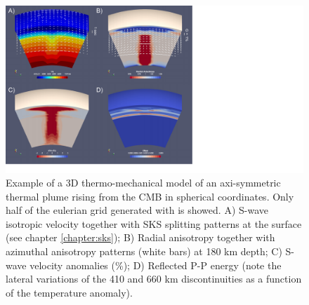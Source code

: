 \begin{figure}[ht]
    \centering
    \includegraphics[width=1.0\textwidth]{VIZTOMO/plume.pdf}
    \caption{Example of a 3D thermo-mechanical model of an axi-symmetric thermal plume rising from the CMB in spherical coordinates. Only half of the eulerian grid generated with \viztomotitle{} is showed. A) S-wave isotropic velocity together with SKS splitting patterns at the surface (see chapter \ref{chapter:sks}); B) Radial anisotropy together with azimuthal anisotropy patterns (white bars) at 180 km depth; C) S-wave velocity anomalies (\%); D) Reflected P-P energy (note the lateral variations of the 410 and 660 km discontinuities as a function of the temperature anomaly).
    }
    \label{fig:plume}
\end{figure}

